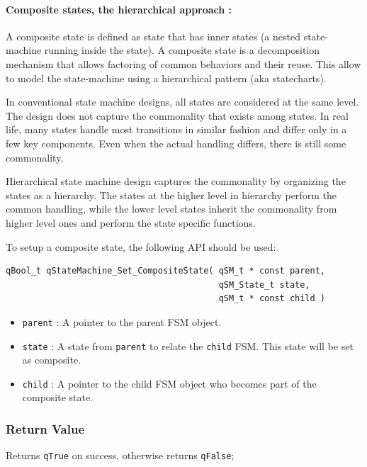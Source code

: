 \documentclass{article}
\begin{document}
\paragraph{Composite states, the hierarchical approach : } A composite state is defined as state that has inner states (a nested state-machine running inside the state). A composite state is a decomposition mechanism that allows factoring of common behaviors and their reuse. This allow to model the state-machine using a hierarchical pattern (aka statecharts). 

In conventional state machine designs, all states are considered at the same level. The design does not capture the commonality that exists among states. In real life, many states handle most transitions in similar fashion and differ only in a few key components. Even when the actual handling differs, there is still some commonality.

Hierarchical state machine design captures the commonality by organizing the states as a hierarchy. The states at the higher level in hierarchy perform the common handling, while the lower level states inherit the commonality from higher level ones and perform the state specific functions. 

To setup a composite state, the following API should be used: \\

\begin{lstlisting}[style=CStyle]
qBool_t qStateMachine_Set_CompositeState( qSM_t * const parent, 
                                          qSM_State_t state, 
                                          qSM_t * const child )
\end{lstlisting}

\begin{itemize}
    \item \lstinline{parent} : A pointer to the parent FSM object.
    \item \lstinline{state} : A state from \lstinline{parent} to relate the \lstinline{child} FSM. This state will be set as composite.
    \item \lstinline{child} : A pointer to the child FSM object who becomes part of the composite state.
\end{itemize}

\subsubsection*{Return Value}
Returns \lstinline{qTrue} on success, otherwise returns \lstinline{qFalse};
\end{document}
